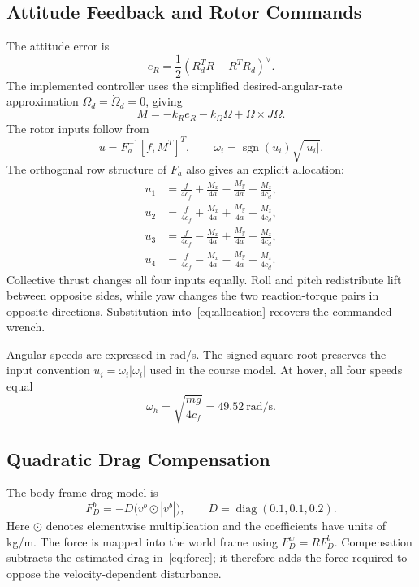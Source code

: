 \documentclass[letterpaper,10pt,conference]{ieeeconf}
\newcommand{\diag}{\operatorname{diag}}
\newcommand{\sgn}{\operatorname{sgn}}
\begin{document}
\subsection{Attitude Feedback and Rotor Commands}
The attitude error is
\begin{equation}
e_R=\frac12(R_d^TR-R^TR_d)^\vee.
\end{equation}
The implemented controller uses the simplified desired-angular-rate approximation $\Omega_d=\dot\Omega_d=0$, giving
\begin{equation}
M=-k_Re_R-k_\Omega\Omega+\Omega\times J\Omega.
\label{eq:moment}
\end{equation}
The rotor inputs follow from
\begin{equation}
u=F_a^{-1}[f,M^T]^T,\qquad
\omega_i=\sgn(u_i)\sqrt{|u_i|}.
\end{equation}
The orthogonal row structure of $F_a$ also gives an explicit allocation:
\begin{align}
u_1&=\frac{f}{4c_f}+\frac{M_x}{4a}-\frac{M_y}{4a}+\frac{M_z}{4c_d},\\
u_2&=\frac{f}{4c_f}+\frac{M_x}{4a}+\frac{M_y}{4a}-\frac{M_z}{4c_d},\\
u_3&=\frac{f}{4c_f}-\frac{M_x}{4a}+\frac{M_y}{4a}+\frac{M_z}{4c_d},\\
u_4&=\frac{f}{4c_f}-\frac{M_x}{4a}-\frac{M_y}{4a}-\frac{M_z}{4c_d}.
\end{align}
Collective thrust changes all four inputs equally. Roll and pitch redistribute lift between opposite sides, while yaw changes the two reaction-torque pairs in opposite directions. Substitution into~\eqref{eq:allocation} recovers the commanded wrench.

Angular speeds are expressed in rad/s. The signed square root preserves the input convention $u_i=\omega_i|\omega_i|$ used in the course model. At hover, all four speeds equal
\begin{equation}
\omega_h=\sqrt{\frac{mg}{4c_f}}=49.52\ \mathrm{rad/s}.
\end{equation}

\subsection{Quadratic Drag Compensation}\label{sec:drag-law}
The body-frame drag model is
\begin{equation}
F_D^b=-D\big(v^b\odot|v^b|\big),\qquad
D=\diag(0.1,0.1,0.2).
\end{equation}
Here $\odot$ denotes elementwise multiplication and the coefficients have units of kg/m. The force is mapped into the world frame using $F_D^w=RF_D^b$. Compensation subtracts the estimated drag in~\eqref{eq:force}; it therefore adds the force required to oppose the velocity-dependent disturbance.
\end{document}
